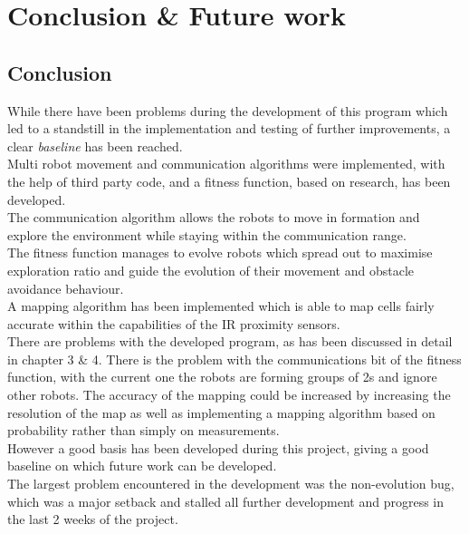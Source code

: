 \chapter{Conclusion \& Future work}
\section{Conclusion}
While there have been problems during the development of this program which led to a standstill in the implementation and testing of further improvements, a clear \textit{baseline} has been reached.\\

Multi robot movement and communication algorithms were implemented, with the help of third party code, and a fitness function, based on research, has been developed.\\
The communication algorithm allows the robots to move in formation and explore the environment while staying within the communication range. \\
The fitness function manages to evolve robots which spread out to maximise exploration ratio and guide the evolution of their movement and obstacle avoidance behaviour. \\
A mapping algorithm has been implemented which is able to map cells fairly accurate within the capabilities of the IR proximity sensors.\\

There are problems with the developed program, as has been discussed in detail in chapter 3 \& 4. There is the problem with the communications bit of the fitness function, with the current one the robots are forming groups of 2s and ignore other robots. The accuracy of the mapping could be increased by increasing the resolution of the map as well as implementing a mapping algorithm based on probability rather than simply on measurements. \\
However a good basis has been developed during this project, giving a good baseline on which future work can be developed.\\

The largest problem encountered in the development was the non-evolution bug, which was a major setback and stalled all further development and progress in the last 2 weeks of the project. \\


